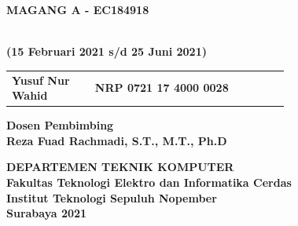 \begin{flushleft}

  \sffamily

  \noindent\textbf{MAGANG A - EC184918}
  \vspace{4ex}

   \\
  \textbf{(15 Februari 2021 s/d 25 Juni 2021)}
  \vspace{4ex}

  \vspace{4ex}

  \begin{adjustwidth}{-2mm}{}
    \begin{tabular}{lcp{0.7\linewidth}}
      \textbf{Yusuf Nur Wahid} & & \textbf{NRP 0721 17 4000 0028} \\
    \end{tabular}
  \end{adjustwidth}
  \vspace{4ex}

  \noindent
  \textbf{Dosen Pembimbing} \\
  \textbf{Reza Fuad Rachmadi, S.T., M.T., Ph.D}
  \vspace{10ex}

  \noindent\textbf{DEPARTEMEN TEKNIK KOMPUTER} \\
  \textbf{Fakultas Teknologi Elektro dan Informatika Cerdas} \\
  \textbf{Institut Teknologi Sepuluh Nopember} \\
  \textbf{Surabaya 2021}

\end{flushleft}

\restoregeometry